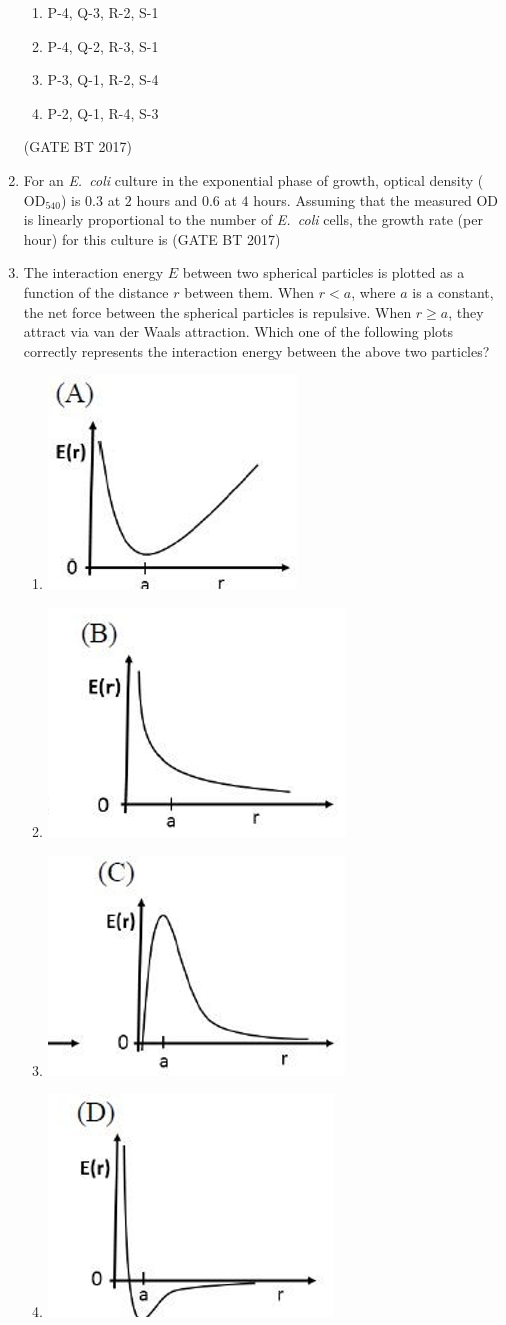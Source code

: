 \documentclass[journal,12pt,onecolumn]{IEEEtran}
\theoremstyle{remark}
\begin{document}
\begin{enumerate}
\begin{enumerate}
    \item P-4, Q-3, R-2, S-1
    \item P-4, Q-2, R-3, S-1
    \item P-3, Q-1, R-2, S-4
    \item P-2, Q-1, R-4, S-3
\end{enumerate}
\hfill (GATE BT 2017)

\item For an \textit{E.\ coli} culture in the exponential phase of growth, optical density ($\mathrm{OD}_{540}$) is $0.3$ at $2$ hours and $0.6$ at $4$ hours. Assuming that the measured OD is linearly proportional to the number of \textit{E.\ coli} cells, the growth rate (per hour) for this culture is 
\hfill (GATE BT 2017)

\item 

The interaction energy $E$ between two spherical particles is plotted as a function of the distance $r$ 
between them. When $r<a$, where $a$ is a constant, the net force between the spherical particles is 
repulsive. When $r \geq a$, they attract via van der Waals attraction. Which one of the following plots 
correctly represents the interaction energy between the above two particles?

\begin{enumerate}
    \item \includegraphics[width=0.22\columnwidth]{figs/A.png}
    \item \includegraphics[width=0.22\columnwidth]{figs/B.png}
    \item \includegraphics[width=0.22\columnwidth]{figs/C.png}
    \item \includegraphics[width=0.22\columnwidth]{figs/D.png}
\end{enumerate}



\end{enumerate}
\end{document}
